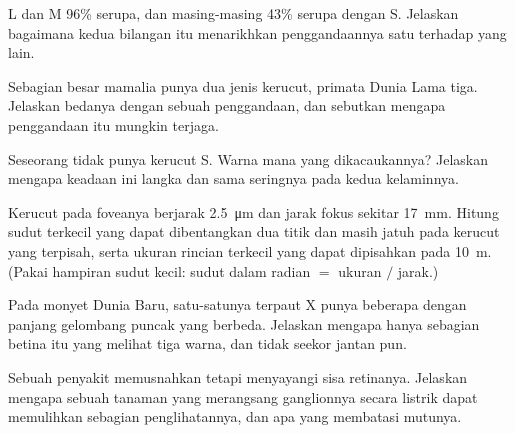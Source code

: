 \begin{exercise}[$\star\star$]\label{exo:g11:the-eye:10}
 L dan M 96\% serupa, dan masing-masing 43\% serupa dengan S.
Jelaskan bagaimana kedua bilangan itu menarikhkan penggandaannya satu
terhadap yang lain.
\end{exercise}

\begin{exercise}[$\star\star$]\label{exo:g11:the-eye:11}
Sebagian besar mamalia punya dua jenis kerucut, primata Dunia Lama
tiga. Jelaskan bedanya dengan sebuah penggandaan, dan sebutkan mengapa
penggandaan itu mungkin terjaga.
\end{exercise}

\begin{exercise}[$\star\star\star$]\label{exo:g11:the-eye:12}
Seseorang tidak punya kerucut S. Warna mana yang dikacaukannya?
Jelaskan mengapa keadaan ini langka dan sama seringnya pada kedua kelaminnya.
\end{exercise}

\begin{exercise}[$\star\star\star$]\label{exo:g11:the-eye:13}
Kerucut pada foveanya berjarak \qty{2.5}{\micro m} dan jarak fokus
 sekitar \qty{17}{mm}. Hitung sudut terkecil yang dapat
dibentangkan dua titik dan masih jatuh pada kerucut yang terpisah,
serta ukuran rincian terkecil yang dapat dipisahkan pada \qty{10}{m}.
(Pakai hampiran sudut kecil: sudut dalam radian $=$ ukuran $/$ jarak.)
\end{exercise}

\begin{exercise}[$\star\star\star$]\label{exo:g11:the-eye:14}
Pada monyet Dunia Baru, satu-satunya   terpaut X punya beberapa
 dengan panjang gelombang puncak yang berbeda. Jelaskan mengapa
hanya sebagian betina  itu yang melihat tiga warna, dan tidak
seekor jantan pun.
\end{exercise}

\begin{exercise}[$\star\star\star$]\label{exo:g11:the-eye:15}
Sebuah penyakit memusnahkan  tetapi menyayangi sisa
retinanya. Jelaskan mengapa sebuah tanaman yang merangsang 
ganglionnya secara listrik dapat memulihkan sebagian penglihatannya,
dan apa yang membatasi mutunya.
\end{exercise}

